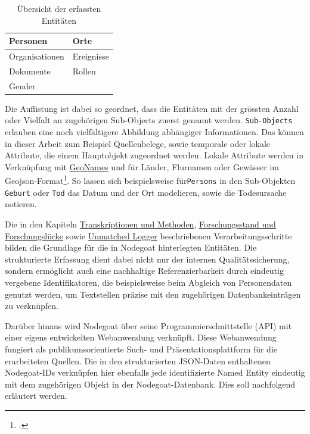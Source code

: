 \documentclass[12pt, a4paper, ngerman, bidi=default]{article}
\let\cite\footcite
\newcommand{\code}[1]{\colorbox{VeryLightGray}{\texttt{#1}}} %
\begin{document}
\begin{table}[h]
  \renewcommand{\arraystretch}{1.5}
  \centering
  \begin{tabular}{|p{}|p{}|}
    \hline
    Personen & Orte \\ \hline
    Organisationen & Ereignisse \\ \hline
    Dokumente & Rollen \\ \hline
    Gender & \\ \hline
  \end{tabular}
  \caption{\small Übersicht der erfassten Entitäten}
\end{table}

Die Auflistung ist dabei so geordnet, dass die Entitäten mit der grössten Anzahl oder Vielfalt an zugehörigen Sub-Objects zuerst genannt werden. \code{Sub-Objects} erlauben eine
noch vielfältigere Abbildung abhängiger Informationen. Das können in dieser Arbeit zum Beispiel Quellenbelege, sowie temporale oder lokale Attribute, die einem Hauptobjekt zugeordnet werden. Lokale Attribute 
werden in Verknüpfung mit \hyperref[subsubsec:geonames]{GeoNames} und für Länder, Flurnamen oder Gewässer im Geojson-Format\cite[Weiterführend:][]{thomson_geographic_2017}. So lassen sich beispielsweise für\code{Persons}
in den Sub-Objekten \code{Geburt} oder \code{Tod} das Datum und der Ort modelieren, sowie die Todesursache notieren.

Die in den Kapiteln \hyperref[section:Transkriptionen_Methoden]{Transkriptionen und Methoden}, \hyperref[subsec:forschungsstand]{Forschungsstand und Forschungslücke} 
sowie \hyperref[subsec:unmatched_logger]{Unmatched Logger} beschriebenen Verarbeitungsschritte bilden die Grundlage für die in Nodegoat hinterlegten Entitäten.
Die strukturierte Erfassung dient dabei nicht nur der internen Qualitätssicherung, sondern ermöglicht auch eine nachhaltige Referenzierbarkeit durch eindeutig 
vergebene Identifikatoren, die beispielsweise beim Abgleich von Personendaten genutzt werden, um Textstellen präzise mit den zugehörigen Datenbankeinträgen zu verknüpfen.

Darüber hinaus wird Nodegoat über seine Programmierschnittstelle (API) mit einer eigens entwickelten Webanwendung verknüpft. Diese Webanwendung fungiert als publikumsorientierte 
Such- und Präsentationsplattform für die erarbeiteten Quellen. Die in den strukturierten JSON-Daten enthaltenen Nodegoat-IDs verknüpfen hier ebenfalls jede identifizierte Named Entity eindeutig mit dem 
zugehörigen Objekt in der Nodegoat-Datenbank. Dies soll nachfolgend erläutert werden.
\end{document}
